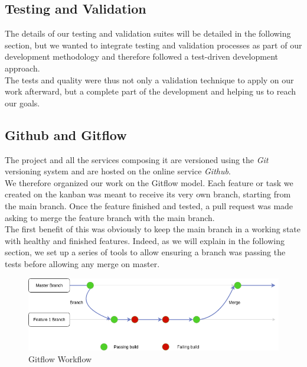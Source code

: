 \documentclass{eplmastersthesis}
\begin{document}
        \subsection{Testing and Validation}

          The details of our testing and validation suites will be detailed
          in the following section, but we wanted to integrate testing and
          validation processes as part of our development methodology and
          therefore followed a test-driven development approach.\\
          The tests and quality were thus not only a validation technique to
          apply on our work afterward, but a complete part of the development
          and helping us to reach our goals.

        \subsection{Github and Gitflow}

          The project and all the services composing it are versioned using the
          \textit{Git} versioning system and are hosted on the online service
          \textit{Github}.\\
          We therefore organized our work on the Gitflow model. Each feature or
          task we created on the kanban was meant to receive its very own
          branch, starting from the main branch.
          Once the feature finished and tested, a pull request was made asking
          to merge the feature branch with the main branch.\\
          The first benefit of this was obviously to keep the main branch in
          a working state with healthy and finished features. Indeed, as
          we will explain in the following section, we set up a series of tools
          to allow ensuring a branch was passing the tests before allowing any
          merge on master.\\

          \begin{figure}[H]
            \centering
            \includegraphics[scale=0.6]{figures/gitflow.png}
            \caption{\label{prev_arch} Gitflow Workflow}
          \end{figure}
\end{document}
